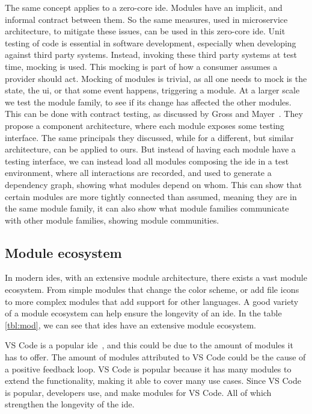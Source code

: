 The same concept applies to a zero-core \gls*{ide}. Modules have an implicit, and
informal contract between them. So the same measures, used in microservice
architecture, to mitigate these issues, can be used in this zero-core \gls*{ide}.
Unit testing of code is essential in software development, especially when
developing against third party systems. Instead, invoking these third party
systems at test time, mocking is used. This mocking is part of how a consumer
assumes a provider should act. Mocking of modules is trivial, as all one needs
to mock is the state, the \gls*{ui}, or that some event happens, triggering a
module. At a larger scale we test the module family, to see if its change has
affected the other modules. This can be done with contract testing, as discussed
by Gross and Mayer~\cite{GROSS200322}. They propose a component architecture,
where each module exposes some testing interface. The same principals they
discussed, while for a different, but similar architecture, can be applied to
ours. But instead of having each module have a testing interface, we can instead
load all modules composing the \gls*{ide} in a test environment, where all
interactions are recorded, and used to generate a dependency graph, showing what
modules depend on whom. This can show that certain modules are more tightly
connected than assumed, meaning they are in the same module family, it can also
show what module families communicate with other module families, showing module
communities.


\subsection{Module ecosystem}

In modern \gls*{ide}s, with an extensive module architecture, there exists a
vast module ecosystem. From simple modules that change the color scheme, or
add file icons to more complex modules that add support for other languages.
A good variety of a module ecosystem can help ensure the longevity of an
\gls*{ide}. In the table \ref{tbl:mod}, we can see that \gls*{ide}s have an
extensive module ecosystem.\footnotemark{}


VS Code is a popular \gls*{ide}~\cite{topIde}, and this could be due to
the amount of modules it has to offer. The amount of modules attributed to
VS Code could be the cause of a positive feedback loop. VS Code is
popular because it has many modules to extend the functionality, making it able
to cover many use cases. Since VS Code is popular, developers use, and make
modules for VS Code. All of which strengthen the longevity of the
\gls*{ide}.

